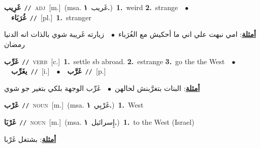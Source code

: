 \documentclass[10pt,a4paper,twoside]{article} %
\begin{document}
\begin{multicols}{2}
{{{{{{{{\setlength\topsep{0pt}\textbf{\foreignlanguage{arabic}{غَرِيب}}\ {\color{gray}\texttt{//}\color{black}}\ \textsc{adj}\ [m.]\ \color{gray}(msa. \foreignlanguage{arabic}{غَريب}~\foreignlanguage{arabic}{\textbf{١.}})\color{black}\ \textbf{1.}~weird  \textbf{2.}~strange\ \ $\bullet$\ \ \setlength\topsep{0pt}\textbf{\foreignlanguage{arabic}{غُرَبَاء}}\ {\color{gray}\texttt{//}\color{black}}\ [pl.]\ \textbf{1.}~stranger\  \begin{flushright}\color{gray}\foreignlanguage{arabic}{\textbf{\underline{\foreignlanguage{arabic}{أمثلة}}}: امي نبهت علي اني ما أحكيش مع الغُرَباء\ $\bullet$\ \  زيارته غَريبة شوي بالذات انه الدنيا رمضان}\end{flushright}\color{black}} \vspace{2mm}

{\setlength\topsep{0pt}\textbf{\foreignlanguage{arabic}{غَرِّب}}\ {\color{gray}\texttt{//}\color{black}}\ \textsc{verb}\ [c.]\ \textbf{1.}~settle sb abroad.  \textbf{2.}~estrange  \textbf{3.}~go the the West\ \ $\bullet$\ \ \setlength\topsep{0pt}\textbf{\foreignlanguage{arabic}{يغَرِّب}}\ {\color{gray}\texttt{//}\color{black}}\ [i.]\ \ $\bullet$\ \ \setlength\topsep{0pt}\textbf{\foreignlanguage{arabic}{غَرَّب}}\ {\color{gray}\texttt{//}\color{black}}\ [p.]\  \begin{flushright}\color{gray}\foreignlanguage{arabic}{\textbf{\underline{\foreignlanguage{arabic}{أمثلة}}}: البنات بتغرَّبنش لحالهن\ $\bullet$\ \  غَرِّب الوجهة بلكي بتغير جو شوي}\end{flushright}\color{black}} \vspace{2mm}

{\setlength\topsep{0pt}\textbf{\foreignlanguage{arabic}{غَرْب}}\ {\color{gray}\texttt{//}\color{black}}\ \textsc{noun}\ [m.]\ \color{gray}(msa. \foreignlanguage{arabic}{غَرْبِي}~\foreignlanguage{arabic}{\textbf{١.}})\color{black}\ \textbf{1.}~West\ 

{\setlength\topsep{0pt}\textbf{\foreignlanguage{arabic}{غَرْبَا}}\ {\color{gray}\texttt{//}\color{black}}\ \textsc{noun}\ [m.]\ \color{gray}(msa. \foreignlanguage{arabic}{إِسرائيل}~\foreignlanguage{arabic}{\textbf{١.}})\color{black}\ \textbf{1.}~to the West (Israel)\  \begin{flushright}\color{gray}\foreignlanguage{arabic}{\textbf{\underline{\foreignlanguage{arabic}{أمثلة}}}: بشتغل غَرْبا}\end{flushright}\color{black}} \vspace{2mm}

}}}}}}}}
\end{multicols}
\end{document}
